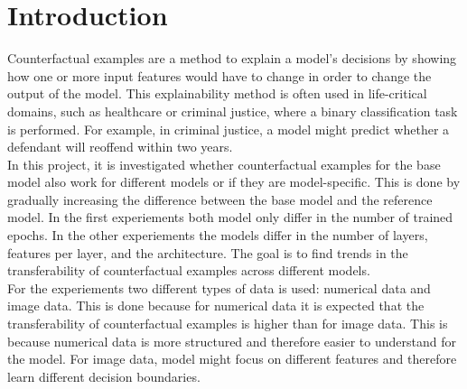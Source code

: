 \documentclass{article}
\begin{document}
\section{Introduction}
Counterfactual examples are a method to explain a model's decisions by showing how one or more input features would have to change in order to change the output of the model. This explainability method is often used in life-critical domains, such as healthcare or criminal justice, where a binary classification task is performed. For example, in criminal justice, a model might predict whether a defendant will reoffend within two years. \\
In this project, it is investigated whether counterfactual examples for the base model also work for different models or if they are model-specific. This is done by gradually increasing the difference between the base model and the reference model. In the first experiements both model only differ in the number of trained epochs. In the other experiements the models differ in the number of layers, features per layer, and the architecture. The goal is to find trends in the transferability of counterfactual examples across different models.\\
For the experiements two different types of data is used: numerical data and image data. This is done because for numerical data it is expected that the transferability of counterfactual examples is higher than for image data. This is because numerical data is more structured and therefore easier to understand for the model. For image data, model might focus on different features and therefore learn different decision boundaries.\\
\end{document}
